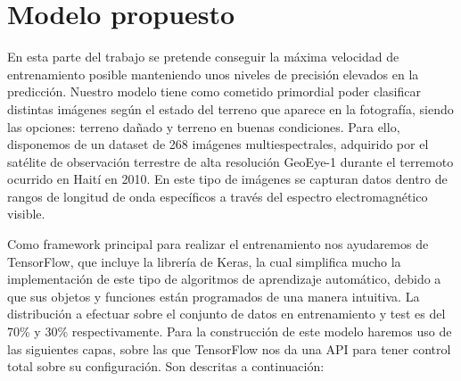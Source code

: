 \section{Modelo propuesto}\label{sec:modelo-propuesto}
En esta parte del trabajo se pretende conseguir la máxima velocidad de entrenamiento posible manteniendo unos niveles de precisión elevados en la predicción.
Nuestro modelo tiene como cometido primordial poder clasificar distintas imágenes según el estado del terreno que aparece en la fotografía, siendo las opciones: terreno dañado y terreno en buenas condiciones. Para ello, disponemos de un dataset de 268 imágenes multiespectrales, adquirido por el satélite de observación terrestre de alta resolución GeoEye-1 durante el terremoto ocurrido en Haití en 2010. En este tipo de imágenes se capturan datos dentro de rangos de longitud de onda específicos a través del espectro electromagnético visible.

Como framework principal para realizar el entrenamiento nos ayudaremos de TensorFlow, que incluye la librería de  Keras, la cual simplifica mucho la implementación de este tipo de algoritmos de aprendizaje automático, debido a que sus objetos y funciones están programados de una manera intuitiva.
La distribución a efectuar sobre el conjunto de datos en entrenamiento y test es del 70\% y 30\% respectivamente.
Para la construcción de este modelo haremos uso de las siguientes capas, sobre las que TensorFlow nos da una API para tener control total sobre su configuración. Son descritas a continuación:


